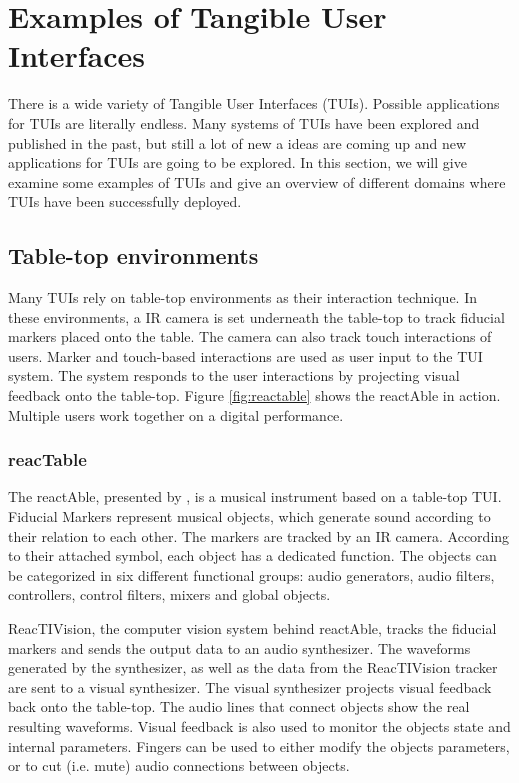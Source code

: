 \section{Examples of Tangible User Interfaces}
There is a wide variety of Tangible User Interfaces (TUIs). Possible applications for TUIs are literally endless. Many systems of TUIs have been explored and published in the past, but still a lot of new a ideas are coming up and new applications for TUIs are going to be explored. In this section, we will give examine some examples of TUIs and give an overview of different domains where TUIs have been successfully deployed.

\subsection{Table-top environments}
\label{sec:tabletop}
Many TUIs rely on table-top environments as their interaction technique. In these environments, a IR camera is set underneath the table-top to track fiducial markers placed onto the table. The camera can also track touch interactions of users. Marker and touch-based interactions are used as user input to the TUI system. The system responds to the user interactions by projecting visual feedback onto the table-top. Figure \ref{fig:reactable} shows the reactAble in action. Multiple users work together on a digital performance.

\subsubsection{reacTable}
The reactAble, presented by \cite{jorda07}, is a musical instrument based on a table-top TUI. Fiducial Markers represent musical objects, which generate sound according to their relation to each other. The markers are tracked by an IR camera. According to their attached symbol, each object has a dedicated function. The objects can be categorized in six different functional groups: audio generators, audio filters, controllers, control filters, mixers and global objects. 

ReacTIVision, the computer vision system behind reactAble, tracks the fiducial markers and sends the output data to an audio synthesizer. The waveforms generated by the synthesizer, as well as the data from the ReacTIVision tracker are sent to a visual synthesizer. The visual synthesizer projects visual feedback back onto the table-top. The audio lines that connect objects show the real resulting waveforms. Visual feedback is also used to monitor the objects state and internal parameters. Fingers can be used to either modify the objects parameters, or to cut (i.e. mute) audio connections between objects. 

